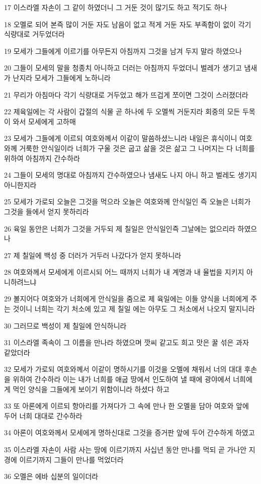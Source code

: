 \par 17 이스라엘 자손이 그 같이 하였더니 그 거둔 것이 많기도 하고 적기도 하나
\par 18 오멜로 되어 본즉 많이 거둔 자도 남음이 없고 적게 거둔 자도 부족함이 없이 각기 식량대로 거두었더라
\par 19 모세가 그들에게 이르기를 아무든지 아침까지 그것을 남겨 두지 말라 하였으나
\par 20 그들이 모세의 말을 청종치 아니하고 더러는 아침까지 두었더니 벌레가 생기고 냄새가 난지라 모세가 그들에게 노하니라
\par 21 무리가 아침마다 각기 식량대로 거두었고 해가 뜨겁게 쪼이면 그것이 스러졌더라
\par 22 제육일에는 각 사람이 갑절의 식물 곧 하나에 두 오멜씩 거둔지라 회중의 모든 두목이 와서 모세에게 고하매
\par 23 모세가 그들에게 이르되 여호와께서 이같이 말씀하셨느니라 내일은 휴식이니 여호와께 거룩한 안식일이라 너희가 구울 것은 굽고 삶을 것은 삶고 그 나머지는 다 너희를 위하여 아침까지 간수하라
\par 24 그들이 모세의 명대로 아침까지 간수하였으나 냄새도 나지 아니 하고 벌레도 생기지 아니한지라
\par 25 모세가 가로되 오늘은 그것을 먹으라 오늘은 여호와께 안식일인 즉 오늘은 너희가 그것을 들에서 얻지 못하리라
\par 26 육일 동안은 너희가 그것을 거두되 제 칠일은 안식일인즉 그날에는 없으리라 하였으나
\par 27 제 칠일에 백성 중 더러가 거두러 나갔다가 얻지 못하니라
\par 28 여호와께서 모세에게 이르시되 어느 때까지 너희가 내 계명과 내 율법을 지키지 아니하려느냐
\par 29 볼지어다 여호와가 너희에게 안식일을 줌으로 제 육일에는 이들 양식을 너희에게 주는 것이니 너희는 각기 처소에 있고 제 칠일 에는 아무도 그 처소에서 나오지 말지니라
\par 30 그러므로 백성이 제 칠일에 안식하니라
\par 31 이스라엘 족속이 그 이름을 만나라 하였으며 깟씨 같고도 희고 맛은 꿀 섞은 과자 같았더라
\par 32 모세가 가로되 여호와께서 이같이 명하시기를 이것을 오멜에 채워서 너의 대대 후손을 위하여 간수하라 이는 내가 너희를 애굽 땅에서 인도하여 낼 때에 광야에서 너희에게 먹인 양식을 그들에게 보이기 위함이니라 하셨다 하고
\par 33 또 아론에게 이르되 항아리를 가져다가 그 속에 만나 한 오멜을 담아 여호와 앞에 두어 너희 대대로 간수하라
\par 34 아론이 여호와께서 모세에게 명하신대로 그것을 증거판 앞에 두어 간수하게 하였고
\par 35 이스라엘 자손이 사람 사는 땅에 이르기까지 사십년 동안 만나를 먹되 곧 가나안 지경에 이르기까지 그들이 만나를 먹었더라
\par 36 오멜은 에바 십분의 일이더라

